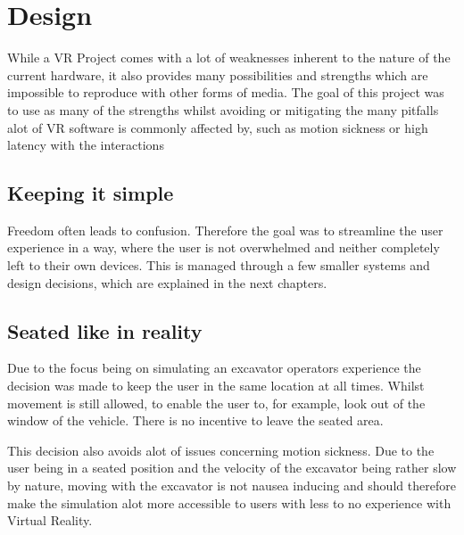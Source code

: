 \documentclass[journal]{vgtc}                     %
\begin{document}
\section{Design}

While a VR Project comes with a lot of weaknesses inherent to the nature of the current hardware, it also provides many possibilities and strengths which are impossible to reproduce with other forms of media.
The goal of this project was to use as many of the strengths whilst avoiding or mitigating the many pitfalls alot of VR software is commonly affected by, such as motion sickness or high latency with the interactions


\subsection{Keeping it simple}

Freedom often leads to confusion. Therefore the goal was to streamline the user experience in a way, where the user is not overwhelmed and neither completely left to their own devices. This is managed through a few smaller systems and design decisions, which are explained in the next chapters.


\subsection{Seated like in reality}

Due to the focus being on simulating an excavator operators experience the decision was made to keep the user in the same location at all times. Whilst movement is still allowed, to enable the user to, for example, look out of the window of the vehicle. There is no incentive to leave the seated area.

This decision also avoids alot of issues concerning motion sickness. Due to the user being in a seated position and the velocity of the excavator being rather slow by nature, moving with the excavator is not nausea inducing and should therefore make the simulation alot more accessible to users with less to no experience with Virtual Reality.
\end{document}
